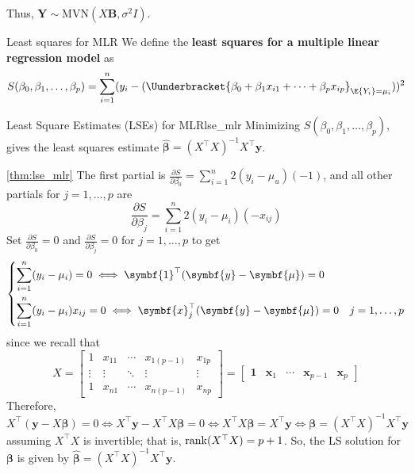 Thus, $ \symbf{Y}\sim \text{MVN}(X\symbf{B},\sigma^2 I) $.
\begin{Definition}{Least squares for MLR}{}
    We define the \textbf{least squares for a multiple linear regression model}
    as
    \[ S(\beta_0,\beta_1,\ldots,\beta_p)
        =\sum\limits_{i=1}^{n}
        (y_i-(\Uunderbracket{
            \beta_0+\beta_1 x_{i1}+\cdots+\beta_p x_{ip}
        }_{\E{Y_i}=\mu_i}))^2
    \]
\end{Definition}
\begin{Theorem}{Least Square Estimates (LSEs) for MLR}{lse_mlr}
    Minimizing $ S(\beta_0,\beta_1,\ldots,\beta_p) $, gives the least squares
    estimate $ \hat{\symbf{\beta}}=(X^\top X)^{-1}X^\top\symbf{y} $.
\end{Theorem}
\begin{Proof}{\ref{thm:lse_mlr}}{}
    The first partial is $ \frac{\partial S}{\partial \beta_0}=\sum\limits_{i=1}^{n} 2(y_i-\mu_u)(-1) $,
    and all other partials for $ j=1,\ldots,p $ are
    \[ \dfrac{\partial S}{\partial \beta_j}=
        \sum\limits_{i=1}^{n} 2(y_i-\mu_i)(-x_{i j}) \]
    Set $ \displaystyle \frac{\partial S}{\partial \beta_0}=0 $
    and $ \displaystyle \frac{\partial S}{\partial \beta_j}=0 $ for $ j=1,\ldots,p $
    to get
    \[ \begin{dcases}
            \sum\limits_{i=1}^{n} (y_i-\mu_i)=0\iff \symbf{1}^\top(\symbf{y}-\symbf{\mu})=0 \\
            \sum\limits_{i=1}^{n} (y_i-\mu_i)x_{i j}=0\iff \symbf{x}_{j}^\top
            (\symbf{y}-\symbf{\mu})=0 & j=1,\ldots,p
        \end{dcases} \]
    since we recall that
    \[ X=\begin{bmatrix}
            1      & x_{11} & \cdots & x_{1(p-1)} & x_{1p}  \\
            \vdots & \vdots & \ddots & \vdots     & \vdots  \\
            1      & x_{n1} & \cdots & x_{n(p-1)} & x_{n p}
        \end{bmatrix}=
        \begin{bmatrix}
            \symbf{1} & \symbf{x}_1 & \cdots & \symbf{x}_{p-1} & \symbf{x}_p
        \end{bmatrix} \]
    Therefore,
    \[ X^\top(\symbf{y}-X\symbf{\beta})=0\iff
        X^\top \symbf{y}-X^\top X\symbf{\beta}=0\iff
        X^\top X \symbf{\beta}=X^\top \symbf{y}\iff
        \symbf{\beta}=(X^\top X)^{-1}X^\top \symbf{y} \]
    assuming $ X^\top X $ is invertible; that is,
    $ \operatorname{rank}(X^\top X)=p+1 $. So, the LS solution for $ \symbf{\beta} $ is given by
    $ \hat{\symbf{\beta}}=(X^\top X)^{-1}X^\top \symbf{y} $.
\end{Proof}
